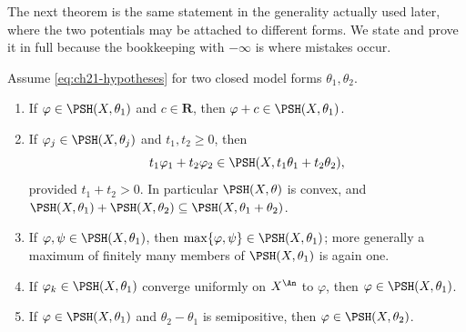 The next theorem is the same statement in the generality actually used
later, where the two potentials may be attached to different forms.  We
state and prove it in full because the bookkeeping with \(-\infty\) is where
mistakes occur.

\begin{theorem}
\label{thm:ch21-stability}
Assume \eqref{eq:ch21-hypotheses} for two closed model forms
\(\theta_1,\theta_2\).
\begin{enumerate}
\item\label{itm:ch21-stab:const}
If \(\varphi\in\PSH(X,\theta_1)\) and \(c\in\mathbf R\), then
\(\varphi+c\in\PSH(X,\theta_1)\).
\item\label{itm:ch21-stab:sum}
If \(\varphi_j\in\PSH(X,\theta_j)\) and \(t_1,t_2\geq0\), then
\[
 t_1\varphi_1+t_2\varphi_2\in\PSH(X,t_1\theta_1+t_2\theta_2),
\]
provided \(t_1+t_2>0\).  In particular \(\PSH(X,\theta)\) is convex, and
\(\PSH(X,\theta_1)+\PSH(X,\theta_2)\subseteq\PSH(X,\theta_1+\theta_2)\).
\item\label{itm:ch21-stab:max}
If \(\varphi,\psi\in\PSH(X,\theta_1)\), then
\(\max\{\varphi,\psi\}\in\PSH(X,\theta_1)\); more generally a maximum of
finitely many members of \(\PSH(X,\theta_1)\) is again one.
\item\label{itm:ch21-stab:unif}
If \(\varphi_k\in\PSH(X,\theta_1)\) converge uniformly on \(X^{\An}\) to
\(\varphi\), then \(\varphi\in\PSH(X,\theta_1)\).
\item\label{itm:ch21-stab:mono}
If \(\varphi\in\PSH(X,\theta_1)\) and \(\theta_2-\theta_1\) is semipositive,
then \(\varphi\in\PSH(X,\theta_2)\).
\end{enumerate}
\end{theorem}


